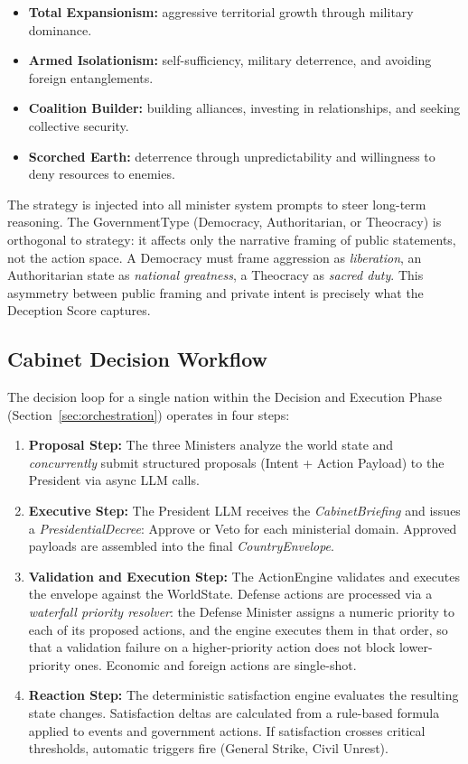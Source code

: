 \begin{itemize}
    \item \textbf{Total Expansionism:} aggressive territorial growth through military dominance.
    \item \textbf{Armed Isolationism:} self-sufficiency, military deterrence, and avoiding foreign entanglements.
    \item \textbf{Coalition Builder:} building alliances, investing in relationships, and seeking collective security.
    \item \textbf{Scorched Earth:} deterrence through unpredictability and willingness to deny resources to enemies.
\end{itemize}

The strategy is injected into all minister system prompts to steer long-term reasoning. The GovernmentType (Democracy, Authoritarian, or Theocracy) is orthogonal to strategy: it affects only the narrative framing of public statements, not the action space. A Democracy must frame aggression as \textit{liberation}, an Authoritarian state as \textit{national greatness}, a Theocracy as \textit{sacred duty}. This asymmetry between public framing and private intent is precisely what the Deception Score captures.

\subsection{Cabinet Decision Workflow}
The decision loop for a single nation within the Decision and Execution Phase (Section~\ref{sec:orchestration}) operates in four steps:
\begin{enumerate}
    \item \textbf{Proposal Step:} The three Ministers analyze the world state and \textit{concurrently} submit structured proposals (Intent + Action Payload) to the President via async LLM calls.
    \item \textbf{Executive Step:} The President LLM receives the \textit{CabinetBriefing} and issues a \textit{PresidentialDecree}: Approve or Veto for each ministerial domain. Approved payloads are assembled into the final \textit{CountryEnvelope}.
    \item \textbf{Validation and Execution Step:} The ActionEngine validates and executes the envelope against the WorldState. Defense actions are processed via a \textit{waterfall priority resolver}: the Defense Minister assigns a numeric priority to each of its proposed actions, and the engine executes them in that order, so that a validation failure on a higher-priority action does not block lower-priority ones. Economic and foreign actions are single-shot.
    \item \textbf{Reaction Step:} The deterministic satisfaction engine evaluates the resulting state changes. Satisfaction deltas are calculated from a rule-based formula applied to events and government actions. If satisfaction crosses critical thresholds, automatic triggers fire (General Strike, Civil Unrest).
\end{enumerate}

